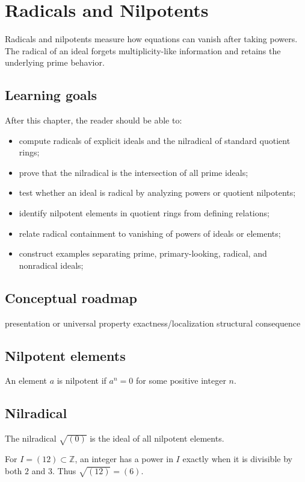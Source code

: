 \chapter{Radicals and Nilpotents}
\label{ch:v03}

Radicals and nilpotents measure how equations can vanish after taking powers. The radical of an ideal forgets multiplicity-like information and retains the underlying prime behavior.

\section*{Learning goals}
After this chapter, the reader should be able to:
\begin{itemize}
\item compute radicals of explicit ideals and the nilradical of standard quotient rings;
\item prove that the nilradical is the intersection of all prime ideals;
\item test whether an ideal is radical by analyzing powers or quotient nilpotents;
\item identify nilpotent elements in quotient rings from defining relations;
\item relate radical containment to vanishing of powers of ideals or elements;
\item construct examples separating prime, primary-looking, radical, and nonradical ideals;
\end{itemize}
\section*{Conceptual roadmap}
\volroadmap
  {presentation or universal property}
  {exactness/localization}
  {structural consequence}

\section{Nilpotent elements}
An element $a$ is nilpotent if $a^n=0$ for some positive integer $n$.

\section{Nilradical}
The nilradical $\sqrt{(0)}$ is the ideal of all nilpotent elements.

\begin{example}\label{ex:v03-expand-01}
For $I=(12)\subset\mathbb Z$, an integer has a power in $I$ exactly when it is divisible by both $2$ and $3$. Thus $\sqrt{(12)}=(6)$.
\end{example}

